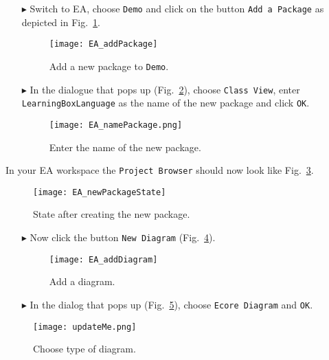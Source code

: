 \visHeader

\begin{enumerate}
\item[$\blacktriangleright$] Switch to EA, choose \texttt{Demo} and click on the button \texttt{Add a Package} as depicted in Fig.~\ref{fig:new_package}.

\begin{figure}[htbp]
	\centering
  \texttt{[image: EA\_addPackage]}
	\caption{Add a new package to \texttt{Demo}.}
	\label{fig:new_package}
\end{figure}

\item[$\blacktriangleright$] In the dialogue that pops up (Fig.~\ref{fig:new_package_name}), choose \texttt{Class View}, enter \texttt{Learning\-Box\-Language} as the name of the new package and click \texttt{OK}.

\begin{figure}[htbp]
	\centering
    \texttt{[image: EA\_namePackage.png]}
	\caption{Enter the name of the new package.}
	\label{fig:new_package_name}
\end{figure}
\end{enumerate}
\FloatBarrier

In your EA workspace the \texttt{Project Browser} should now look like Fig.~\ref{fig:new_package_completed}.
\begin{figure}[htbp]
	\centering
  \texttt{[image: EA\_newPackageState]}
	\caption{State after creating the new package.}
	\label{fig:new_package_completed}
\end{figure}
\FloatBarrier

\begin{enumerate}
\item[$\blacktriangleright$] Now click the button \texttt{New Diagram} (Fig.~\ref{fig:diagram}).

\begin{figure}[htbp]
	\centering
  \texttt{[image: EA\_addDiagram]}
	\caption{Add a diagram.}
	\label{fig:diagram}
\end{figure}
\FloatBarrier
\clearpage

\item[$\blacktriangleright$] In the dialog that pops up (Fig.~\ref{fig:diagram_type}), choose \texttt{Ecore Diagram} and  \texttt{OK}.
\end{enumerate}

\begin{figure}[htbp]
	\centering
  \texttt{[image: updateMe.png]}
	\caption{Choose type of diagram.}
	\label{fig:diagram_type}
\end{figure}
\FloatBarrier

